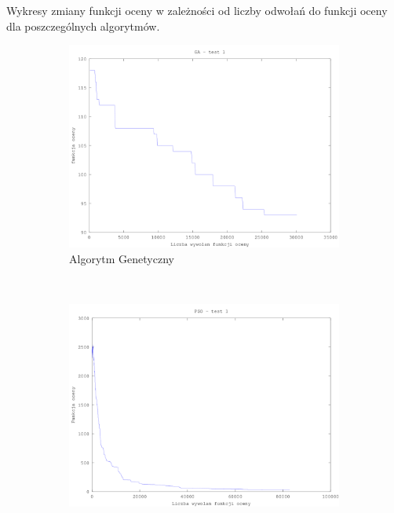 \par  Wykresy zmiany funkcji oceny w zależności od liczby odwołań do funkcji oceny dla poszczególnych algorytmów.
\begin{figure}[H]
        \centering
\begin{subfigure}[b]{0.5\textwidth}
                \includegraphics[width=\textwidth]{ga_test_1.png}
                \caption{Algorytm Genetyczny}
        \end{subfigure}%
        ~ %
        \begin{subfigure}[b]{0.5\textwidth}
                \includegraphics[width=\textwidth]{pso_1.png}

\end{subfigure}
\end{figure}
